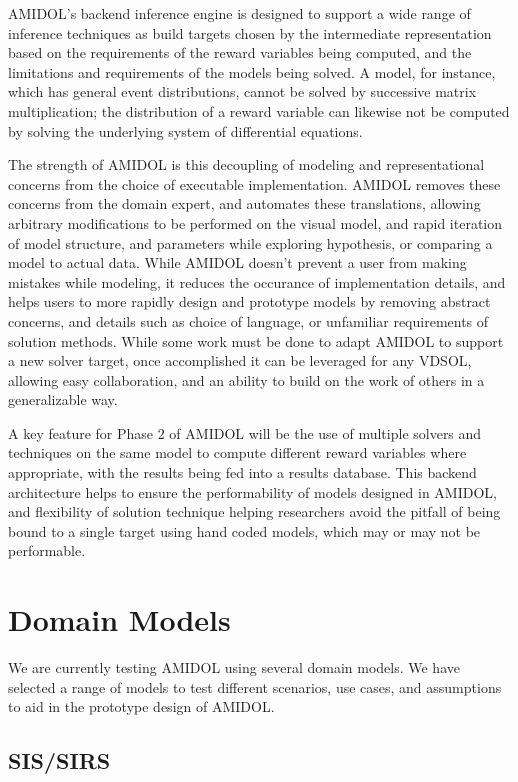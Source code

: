 \documentclass[11pt]{article}
\newcommand{\amidol}{\textsc{AMIDOL}}
\begin{document}
\amidol{}'s backend inference engine is designed to support a wide range of inference techniques as build targets chosen by the intermediate representation based on the requirements of the reward variables being computed, and the limitations and requirements of the models being solved.  A model, for instance, which has general event distributions, cannot be solved by successive matrix multiplication; the distribution of a reward variable can likewise not be computed by solving the underlying system of differential equations.

The strength of \amidol{} is this decoupling of modeling and representational concerns from the choice of executable implementation. \amidol{} removes these concerns from the domain expert, and automates these translations, allowing arbitrary modifications to be performed on the visual model, and rapid iteration of model structure, and parameters while exploring hypothesis, or comparing a model to actual data.  While \amidol{} doesn't prevent a user from making mistakes while modeling, it reduces the occurance of implementation details, and helps users to more rapidly design and prototype models by removing abstract concerns, and details such as choice of language, or unfamiliar requirements of solution methods.  While some work must be done to adapt \amidol{} to support a new solver target, once accomplished it can be leveraged for any VDSOL, allowing easy collaboration, and an ability to build on the work of others in a generalizable way.

A key feature for Phase 2 of \amidol{} will be the use of multiple solvers and techniques on the same model to compute different reward variables where appropriate, with the results being fed into a results database.  This  backend architecture helps to ensure the performability of models designed in \amidol{}, and flexibility of solution technique helping researchers avoid the pitfall of being bound to a single target using hand coded models, which may or may not be performable.


\section{Domain Models}

We are currently testing \amidol{} using several domain models.  We have selected a range of models to test different scenarios, use cases, and assumptions to aid in the prototype design of \amidol{}.

\subsection{SIS/SIRS}
\end{document}
